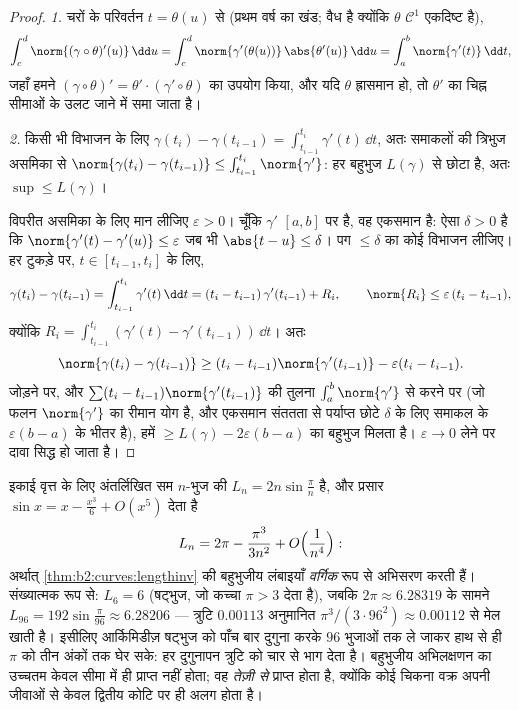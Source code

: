 \begin{proof}
\emph{1.} चरों के परिवर्तन $t = \theta(u)$ से (प्रथम वर्ष का
खंड; वैध है क्योंकि $\theta$ $\mathcal{C}^1$ एकदिष्ट है),
\[
\int_c^d \norm{(\gamma\circ\theta)'(u)}\,\dd u
= \int_c^d \norm{\gamma'(\theta(u))}\,\abs{\theta'(u)}\,\dd u
= \int_a^b \norm{\gamma'(t)}\,\dd t ,
\]
जहाँ हमने $(\gamma\circ\theta)' = \theta'\cdot
(\gamma'\circ\theta)$ का उपयोग किया, और यदि $\theta$ ह्रासमान हो, तो
$\theta'$ का चिह्न सीमाओं के उलट जाने में समा जाता है।

\emph{2.} किसी भी विभाजन के लिए $\gamma(t_i) - \gamma(t_{i-1}) =
\int_{t_{i-1}}^{t_i}\gamma'(t)\,\dd t$, अतः समाकलों की त्रिभुज
असमिका से $\norm{\gamma(t_i) - \gamma(t_{i-1})}
\leq \int_{t_{i-1}}^{t_i}\norm{\gamma'}$: हर बहुभुज $L(\gamma)$ से छोटा है, अतः $\sup \leq L(\gamma)$।

विपरीत असमिका के लिए मान लीजिए $\varepsilon > 0$। चूँकि $\gamma'$
 $[a,b]$ पर  है, वह एकसमान  है: ऐसा $\delta > 0$ है कि
$\norm{\gamma'(t) - \gamma'(u)} \leq
\varepsilon$ जब भी $\abs{t - u} \leq \delta$। पग $\leq \delta$ का कोई विभाजन
लीजिए। हर टुकड़े पर, $t \in [t_{i-1}, t_i]$ के लिए,
\[
\gamma(t_i) - \gamma(t_{i-1})
= \int_{t_{i-1}}^{t_i}\gamma'(t)\,\dd t
= (t_i - t_{i-1})\,\gamma'(t_{i-1}) + R_i,
\qquad
\norm{R_i} \leq \varepsilon\,(t_i - t_{i-1}),
\]
क्योंकि $R_i = \int_{t_{i-1}}^{t_i}(\gamma'(t) -
\gamma'(t_{i-1}))\,\dd t$। अतः
\[
\norm{\gamma(t_i) - \gamma(t_{i-1})}
\geq (t_i - t_{i-1})\norm{\gamma'(t_{i-1})}
- \varepsilon (t_i - t_{i-1}) .
\]
जोड़ने पर, और $\sum (t_i -
t_{i-1})\norm{\gamma'(t_{i-1})}$ की तुलना $\int_a^b\norm{\gamma'}$ से करने पर (जो  फलन
$\norm{\gamma'}$ का रीमान योग है, और एकसमान संततता से पर्याप्त छोटे $\delta$
के लिए समाकल के $\varepsilon(b - a)$ के भीतर है), हमें $\geq
L(\gamma) - 2\varepsilon(b - a)$  का बहुभुज
मिलता है। $\varepsilon \to 0$ लेने पर दावा सिद्ध हो जाता है।
\end{proof}

\begin{example}[आर्किमिडीज़ और अंतर्लिखित
बहुभुज]\label{ex:b2:curves:archimedes}
इकाई वृत्त के लिए अंतर्लिखित सम $n$-भुज की 
$L_n = 2n\sin\frac\pi n$ है, और प्रसार $\sin x = x -
\frac{x^3}6 + O(x^5)$ देता है
\[
L_n = 2\pi - \frac{\pi^3}{3n^2} + O\Bigl(\frac1{n^4}\Bigr) :
\]
अर्थात् \cref{thm:b2:curves:lengthinv} की बहुभुजीय लंबाइयाँ \emph{वर्गिक} रूप से
अभिसरण करती हैं। संख्यात्मक रूप से: $L_6 = 6$
(षट्भुज, जो कच्चा $\pi > 3$ देता है), जबकि $2\pi \approx
6.28319$ के सामने $L_{96} =
192\sin\frac{\pi}{96} \approx 6.28206$ --- त्रुटि $0.00113$ अनुमानित
$\pi^3/(3\cdot96^2) \approx 0.00112$ से मेल खाती है। इसीलिए आर्किमिडीज़ षट्भुज को पाँच बार
दुगुना करके $96$ भुजाओं तक ले जाकर हाथ से ही
$\pi$ को तीन अंकों तक घेर सके: हर दुगुनापन त्रुटि को चार से
भाग देता है। बहुभुजीय अभिलक्षणन का उच्चतम केवल सीमा में ही प्राप्त
नहीं होता; वह \emph{तेज़ी से} प्राप्त होता है, क्योंकि कोई चिकना वक्र
अपनी जीवाओं से केवल द्वितीय कोटि पर ही अलग होता है।
\end{example}


